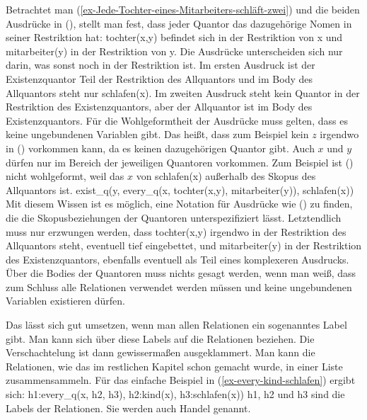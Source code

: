 Betrachtet man (\ref{ex-Jede-Tochter-eines-Mitarbeiters-schläft-zwei}) und die beiden Ausdrücke in
(), stellt man fest, dass jeder Quantor das dazugehörige Nomen in seiner Restriktion hat:
tochter(x,y) befindet sich in der Restriktion von x und mitarbeiter(y) in der Restriktion von y. Die
Ausdrücke unterscheiden sich nur darin, was sonst noch in der Restriktion ist. Im ersten Ausdruck
ist der Existenzquantor Teil der Restriktion des Allquantors und im Body des Allquantors steht nur
schlafen(x). Im zweiten Ausdruck steht kein Quantor in der Restriktion des Existenzquantors, aber
der Allquantor ist im Body des Existenzquantors. Für die Wohlgeformtheit der Ausdrücke muss gelten,
dass es keine ungebundenen Variablen gibt. Das heißt, dass zum Beispiel kein $z$ irgendwo in
() vorkommen kann, da es keinen dazugehörigen Quantor gibt. Auch $x$ und $y$ dürfen nur im
Bereich der jeweiligen Quantoren vorkommen. Zum Beispiel ist () nicht wohlgeformt, weil das
$x$ von schlafen(x) außerhalb des Skopus des Allquantors ist.
\ea
exist\_q(y, every\_q(x, tochter(x,y), mitarbeiter(y)),  schlafen(x))
\z
Mit diesem Wissen ist es möglich, eine Notation für
Ausdrücke wie () zu finden, die die Skopusbeziehungen der Quantoren unterspezifiziert
lässt. Letztendlich muss nur erzwungen werden, dass tochter(x,y) irgendwo in der Restriktion des
Allquantors steht, eventuell tief eingebettet, und mitarbeiter(y) in der Restriktion des
Existenzquantors, ebenfalls eventuell als Teil eines komplexeren Ausdrucks. Über die Bodies der
Quantoren muss nichts gesagt werden, wenn man weiß, dass zum Schluss alle Relationen verwendet
werden müssen und keine ungebundenen Variablen existieren dürfen. 

Das lässt sich gut umsetzen, wenn man allen Relationen ein sogenanntes Label gibt. Man kann sich
über diese Labels auf die Relationen beziehen. Die Verschachtelung ist dann gewissermaßen
ausgeklammert. Man kann die Relationen, wie das im restlichen Kapitel schon gemacht wurde, in einer
Liste zusammensammeln. Für das einfache Beispiel in (\ref{ex-every-kind-schlafen}) ergibt sich:
\ea
\label{ex-every-kind-schlafen-handles}
h1:every\_q(x, h2, h3), h2:kind(x), h3:schlafen(x))
\z
h1, h2 und h3 sind die Labels der Relationen. Sie werden auch Handel genannt.

